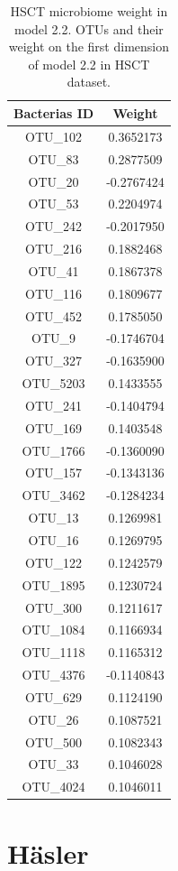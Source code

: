 \documentclass[
  12pt,
  a4paper,
  twoside,
  openright]{book}
\begin{document}
\begin{longtable}[t]{cc}
\caption[HSCT microbiome weight in model 2.2]{\label{tab:hsct-microbiome-2-2}HSCT microbiome weight in model 2.2. OTUs and their weight on the first dimension of model 2.2 in HSCT dataset.}\\
\toprule
Bacterias ID & Weight\\
\midrule
OTU\_102 & 0.3652173\\
OTU\_83 & 0.2877509\\
OTU\_20 & -0.2767424\\
OTU\_53 & 0.2204974\\
OTU\_242 & -0.2017950\\
\addlinespace
OTU\_216 & 0.1882468\\
OTU\_41 & 0.1867378\\
OTU\_116 & 0.1809677\\
OTU\_452 & 0.1785050\\
OTU\_9 & -0.1746704\\
\addlinespace
OTU\_327 & -0.1635900\\
OTU\_5203 & 0.1433555\\
OTU\_241 & -0.1404794\\
OTU\_169 & 0.1403548\\
OTU\_1766 & -0.1360090\\
\addlinespace
OTU\_157 & -0.1343136\\
OTU\_3462 & -0.1284234\\
OTU\_13 & 0.1269981\\
OTU\_16 & 0.1269795\\
OTU\_122 & 0.1242579\\
\addlinespace
OTU\_1895 & 0.1230724\\
OTU\_300 & 0.1211617\\
OTU\_1084 & 0.1166934\\
OTU\_1118 & 0.1165312\\
OTU\_4376 & -0.1140843\\
\addlinespace
OTU\_629 & 0.1124190\\
OTU\_26 & 0.1087521\\
OTU\_500 & 0.1082343\\
OTU\_33 & 0.1046028\\
OTU\_4024 & 0.1046011\\
\bottomrule
\end{longtable}

\hypertarget{huxe4sler}{%
\section{Häsler}\label{huxe4sler}}
\end{document}
